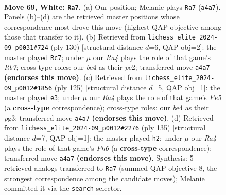 \documentclass[11pt]{article}
\begin{document}
\clearpage

\begin{figure}[p]\centering
\begin{subfigure}{0.46\textwidth}\centering
\resizebox{\linewidth}{!}{%
\newchessgame
\chessboard[
  setfen={6R1/8/3k4/8/RP2b3/8/7r/4K3 w - - 11 69},
  showmover=false,
  pgfstyle=straightmove, color=movearrow, markmove={a4-a7}
]}
\caption{}
\end{subfigure}\hfill
\begin{subfigure}{0.46\textwidth}\centering
\resizebox{\linewidth}{!}{%
\newchessgame
\chessboard[
  setfen={3r4/PR6/8/8/8/4K3/k1p5/8 w - - 0 66},
  showmover=false,
  pgfstyle=straightmove, color=movearrow, markmove={b7-c7}
]}
\caption{}
\end{subfigure}
\\[4pt]
\begin{subfigure}{0.46\textwidth}\centering
\resizebox{\linewidth}{!}{%
\newchessgame
\chessboard[
  setfen={6k1/R7/5p1K/8/4p3/6P1/8/5r2 b - - 0 63},
  showmover=false,
  pgfstyle=straightmove, color=movearrow, markmove={e4-e3}
]}
\caption{}
\end{subfigure}\hfill
\begin{subfigure}{0.46\textwidth}\centering
\resizebox{\linewidth}{!}{%
\newchessgame
\chessboard[
  setfen={8/6R1/8/8/3K4/r6p/8/7k b - - 5 68},
  showmover=false,
  pgfstyle=straightmove, color=movearrow, markmove={h3-h2}
]}
\caption{}
\end{subfigure}
\caption{\textbf{Move 69, White: \texttt{Ra7}.} (a) Our position; Melanie plays \texttt{Ra7} (\texttt{a4a7}). Panels (b)--(d) are the retrieved master positions whose correspondence most drove this move (highest QAP objective among those that transfer to it). (b) Retrieved from \texttt{lichess\_elite\_2024-09\_p0031\#724} (ply 130) [structural distance $d$=6, QAP obj=2]: the master played \texttt{Rc7}; under $\mu$ our \emph{Ra4} plays the role of that game's \emph{Rb7}; cross-type roles: our \emph{b}e4 as their \emph{p}c2; transferred move \texttt{a4a7} \textbf{(endorses this move)}. (c) Retrieved from \texttt{lichess\_elite\_2024-09\_p0012\#1856} (ply 125) [structural distance $d$=5, QAP obj=1]: the master played \texttt{e3}; under $\mu$ our \emph{Ra4} plays the role of that game's \emph{Pe5} (a \textbf{cross-type} correspondence); cross-type roles: our \emph{b}e4 as their \emph{p}g3; transferred move \texttt{a4a7} \textbf{(endorses this move)}. (d) Retrieved from \texttt{lichess\_elite\_2024-09\_p0012\#2276} (ply 135) [structural distance $d$=7, QAP obj=1]: the master played \texttt{h2}; under $\mu$ our \emph{Ra4} plays the role of that game's \emph{Ph6} (a \textbf{cross-type} correspondence); transferred move \texttt{a4a7} \textbf{(endorses this move)}. Synthesis: 5 retrieved analogs transferred to \texttt{Ra7} (summed QAP objective 8, the strongest correspondence among the candidate moves); Melanie committed it via the \texttt{search} selector.}
\label{fig:thought-m136}
\end{figure}
\end{document}

